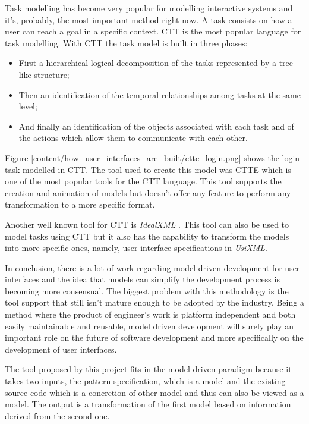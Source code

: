 Task modelling has become very popular for modelling interactive systems and it's, probably, the most important method right now. A task consists on how a user can reach a goal in a specific context. CTT is the most popular language for task modelling. With CTT the task model is built in three phases:
\begin{itemize}
\item First a hierarchical logical decomposition of the tasks represented by a tree-like structure;
\item Then an identification of the temporal relationships among tasks at the same level;
\item And finally an identification of the objects associated with each task and of the actions which allow them to communicate with each other.
\end{itemize} 

Figure \ref{content/how_user_interfaces_are_built/ctte_login.png} shows the login task modelled in CTT. The tool used to create this model was CTTE \cite{ConcurTaskTrees_Environment} which is one of the most popular tools for the CTT language. This tool supports the creation and animation of models but doesn’t offer any feature to perform any transformation to a more specific format.

Another well known tool for CTT is \textit{IdealXML} \cite{IdealXml_An_Interaction_Design_Tool}. This tool can also be used to model tasks using CTT but it also has the capability to transform the models into more specific ones, namely, user interface specifications in \textit{UsiXML}.

In conclusion, there is a lot of work regarding model driven development for user interfaces and the idea that models can simplify the development process is becoming more consensual. The biggest problem with this methodology is the tool support that still isn't mature enough to be adopted by the industry. Being a method where the product of engineer's work is platform independent and both easily maintainable and reusable, model driven development will surely play an important role on the future of software development and more specifically on the development of user interfaces.

The tool proposed by this project fits in the model driven paradigm because it takes two inputs, the pattern specification, which is a model and the existing source code which is a concretion of other model and thus can also be viewed as a model. The output is a transformation of the first model based on information derived from the second one.